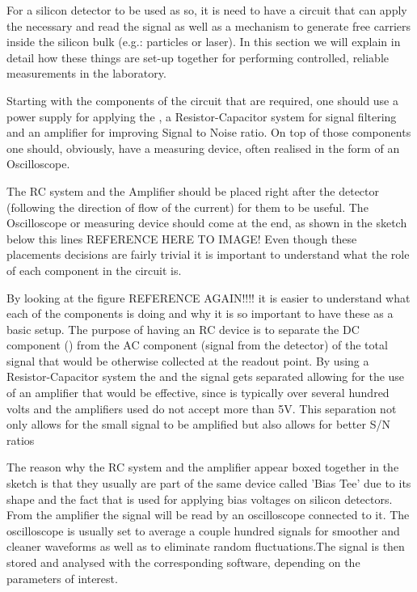 For a silicon detector to be used as so, it is need to have a circuit that can apply the necessary \vias and read the signal as well as a mechanism to generate free carriers inside the silicon bulk (e.g.: particles or laser). In this section we will explain in detail how these things are set-up together for performing controlled, reliable measurements in the laboratory.

Starting with the components of the circuit that are required, one should use a power supply for applying the \vias, a Resistor-Capacitor system for signal filtering and an amplifier for improving Signal to Noise ratio. On top of those components one should, obviously, have a measuring device, often realised in the form of an Oscilloscope.

The RC system and the Amplifier should be placed right after the detector (following the direction of flow of the current) for them to be useful. The Oscilloscope or measuring device should come at the end, as shown in the sketch below this lines REFERENCE HERE TO IMAGE! Even though these placements decisions are fairly trivial it is important to understand what the role of each component in the circuit is.

By looking at the figure REFERENCE AGAIN!!!! it is easier to understand what each of the components is doing and why it is so important to have these as a basic setup. The purpose of having an RC device is to separate the DC component (\vias) from the AC component (signal from the detector) of the total signal that would be otherwise collected at the readout point. By using a Resistor-Capacitor system the \vias and the signal gets separated allowing for the use of an amplifier that would be effective, since \vias is typically over several hundred volts and the amplifiers used do not accept more than 5V. This separation not only allows for the small signal to be amplified but also allows for better S/N ratios 

The reason why the RC system and the amplifier appear boxed together in the sketch is that they usually are part of the same device called 'Bias Tee' due to its shape and the fact that is used for applying bias voltages on silicon detectors. From the amplifier the signal will be read by an oscilloscope connected to it. The oscilloscope is usually set to average a couple hundred signals for smoother and cleaner waveforms as well as to eliminate random fluctuations.The signal is then stored and analysed with the corresponding software, depending on the parameters of interest.

